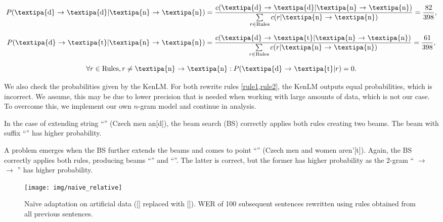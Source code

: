\begin{equation}\label{rule1}
	P( \textnormal{\textipa{d} $\rightarrow$ \textipa{d}} | \textnormal{\textipa{n} $\rightarrow$ \textipa{n}}) =
	\frac{
		c( \textnormal{\textipa{d} $\rightarrow$ \textipa{d}} | \textnormal{\textipa{n} $\rightarrow$ \textipa{n}})
	}{
		\sum\limits_{r \in \textnormal{Rules}} c( r | \textnormal{\textipa{n} $\rightarrow$ \textipa{n}})
	} =
	\frac{82}{398},
\end{equation}

\begin{equation}\label{rule2}
P( \textnormal{\textipa{d} $\rightarrow$ \textipa{t}} | \textnormal{\textipa{n} $\rightarrow$ \textipa{n}}) =
\frac{
	c( \textnormal{\textipa{d} $\rightarrow$ \textipa{t}} | \textnormal{\textipa{n} $\rightarrow$ \textipa{n}})
}{
	\sum\limits_{r \in \textnormal{Rules}} c( r | \textnormal{\textipa{n} $\rightarrow$ \textipa{n}})
} =
\frac{61}{398},
\end{equation}

\begin{equation}
\forall r \in \textnormal{Rules}, r \neq \textnormal{\textipa{n} $\rightarrow$ \textipa{n}}: P( \textnormal{\textipa{d} $\rightarrow$ \textipa{t}} | r) = 0.
\end{equation}

We also check the probabilities given by the KenLM. For both rewrite rules \cref{rule1,rule2}, the KenLM outputs equal probabilities, which is incorrect. We assume, this may be due to lower precision that is needed when working with large amounts of data, which is not our case. To overcome this, we implement our own $n$-gram model and continue in analysis.

In the case of extending string ``'' (Czech men an[d]), the beam search (BS) correctly applies both rules creating two beams. The beam with suffix ``'' has higher probability.

A problem emerges when the BS further extends the beams and comes to point ``'' (Czech men and women aren'[t]). Again, the BS correctly applies both rules, producing beams ``'' and ``''. The latter is correct, but the former has higher probability as the 2-gram `` $\rightarrow$   $\rightarrow$ '' has higher probability.

\begin{figure}[h]
	\texttt{[image: img/naive\_relative]}
	\caption{Na\"ive adaptation on artificial data ([] replaced with []). WER of 100 subsequent sentences rewritten using rules obtained from all previous sentences.}
	\label{fig:naive} 
\end{figure}

